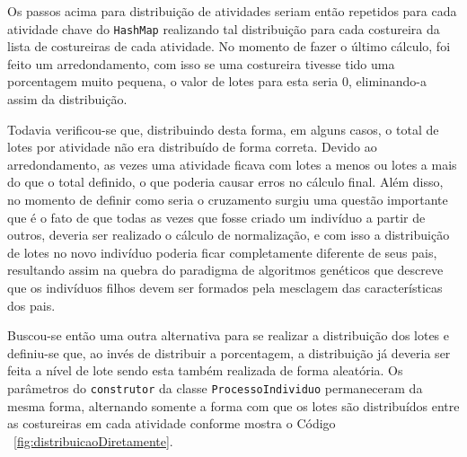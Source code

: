  \par Os passos acima para distribuição de atividades seriam então repetidos
 para cada atividade chave do \texttt{HashMap} realizando tal distribuição para cada costureira da lista de 
 costureiras de cada atividade. No momento de fazer o último cálculo, foi feito
 um arredondamento, com isso se uma costureira tivesse tido uma porcentagem muito pequena, o valor de lotes para
 esta seria 0, eliminando-a assim da distribuição.
 
 \par Todavia verificou-se que, distribuindo desta forma, em alguns casos, o total de lotes por atividade não era distribuído
 de forma correta. Devido ao arredondamento, as vezes uma atividade ficava com lotes a menos ou lotes a mais do que o total
 definido, o que poderia causar erros no cálculo final. Além disso, no momento de definir como seria o cruzamento 
 surgiu uma questão importante que é o fato de que todas as vezes que fosse criado um indivíduo a partir de outros, deveria
 ser realizado o cálculo de normalização, e com isso a distribuição de lotes no novo indivíduo poderia ficar completamente
 diferente de seus pais, resultando assim na quebra do paradigma de algoritmos genéticos que descreve que os indivíduos filhos
 devem ser formados pela mesclagem das características dos pais. 


\par Buscou-se então uma outra alternativa para se realizar a distribuição dos lotes e definiu-se que, ao invés de distribuir
a porcentagem, a distribuição já deveria ser feita a nível de lote sendo esta também realizada de forma aleatória. Os parâmetros
do \texttt{construtor} da classe \texttt{ProcessoIndividuo} permaneceram da mesma forma, alternando somente a forma com que 
os lotes são distribuídos entre as costureiras em cada atividade conforme mostra
o Código ~\ref{fig:distribuicaoDiretamente}.


